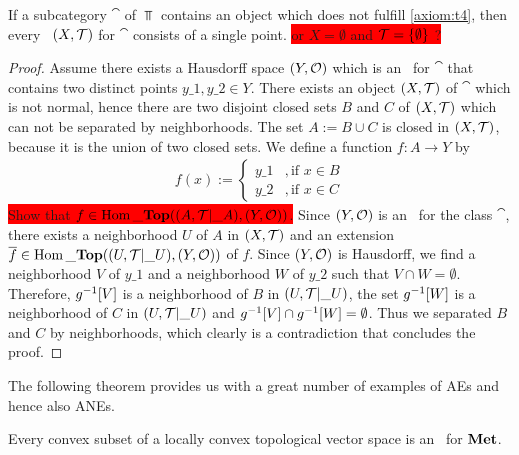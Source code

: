 \begin{proposition}
	If a subcategory $\cat$ of $\Top$ contains an object which does not fulfill \ref{axiom:t4}, then every \ane\ $\tspace$ for $\cat$ consists  of a single point. \colorbox{red}{or $X = \emptyset$ and $\mathcal{T} = {\left \{ \emptyset \right \}}$ ?}
\end{proposition}
\begin{proof}
	Assume there exists a Hausdorff space $\tspace[Y][O]$ which is an \ane\ for $\cat$ that contains two distinct points $y\_1, y\_2 \in Y$. There exists an object $\tspace$ of $\cat$ which is not normal, hence there are two disjoint closed sets $B$ and $C$ of $\tspace$ which can not be separated by neighborhoods. The set $A := B \cup C$ is closed in $\tspace$, because it is the union of two closed sets. We define a function $f: A \to Y$ by
	\begin{align*}
		f(x) := 
		\begin{cases}
			y\_1 &, \text{if } x \in B \\
			y\_2 &, \text{if } x \in C
		\end{cases}
	\end{align*} 
	\colorbox{red}{Show that $f \in \Hom\_\Top\pbraces{\reltspace, \tspace[Y][O]}$.} Since $\tspace[Y][O]$ is an \ane\ for the class $\cat$, there exists a neighborhood $U$ of $A$ in $\tspace$ and an extension $\overline{f} \in \Hom\_\Top\pbraces{\reltspace[U], \tspace[Y][O]}$ of $f$. Since $\tspace[Y][O]$ is Hausdorff, we find a neighborhood $V$ of $y\_1$ and a neighborhood $W$ of $y\_2$ such that $V \cap W = \emptyset$. Therefore, $g^{-1}{\left [ V \right ]}$ is a neighborhood of $B$ in $\reltspace[U]$, the set $g^{-1}{\left [ W \right ]}$ is a neighborhood of $C$ in $\reltspace[U]$ and $g^{-1}{\left [ V \right ]} \cap g^{-1}{\left [ W \right ]} = \emptyset$. Thus we separated $B$ and $C$ by neighborhoods, which clearly is a contradiction that concludes the proof. 
\end{proof}

The following theorem provides us with a great number of examples of AEs and hence also ANEs. 

\begin{theorem}
	Every convex subset of a locally convex topological vector space is an \aex\ for $\mathbf{Met}$.
\end{theorem}

